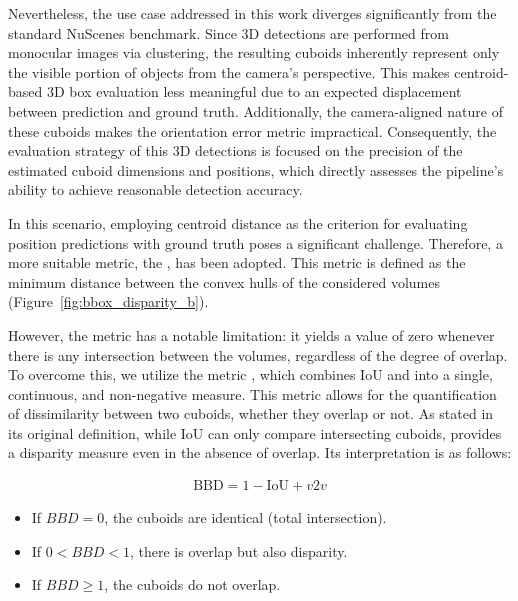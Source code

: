 Nevertheless, the use case addressed in this work diverges significantly from the standard NuScenes benchmark. Since 3D detections are performed from monocular images via clustering, the resulting cuboids inherently represent only the visible portion of objects from the camera's perspective. This makes centroid-based 3D box evaluation less meaningful due to an expected displacement between prediction and ground truth. Additionally, the camera-aligned nature of these cuboids makes the orientation error metric impractical. Consequently, the evaluation strategy of this 3D detections is focused on the precision of the estimated cuboid dimensions and positions, which directly assesses the pipeline's ability to achieve reasonable detection accuracy.

In this scenario, employing centroid distance as the criterion for evaluating position predictions with ground truth poses a significant challenge. Therefore, a more suitable metric, the , has been adopted. This metric is defined as the minimum distance between the convex hulls of the considered volumes (Figure~\ref{fig:bbox_disparity_b}).

However, the  metric has a notable limitation: it yields a value of zero whenever there is any intersection between the volumes, regardless of the degree of overlap. To overcome this, we utilize the  metric \cite{bounding_box_disparity}, which combines IoU and  into a single, continuous, and non-negative measure. This metric allows for the quantification of dissimilarity between two cuboids, whether they overlap or not. As stated in its original definition, while IoU can only compare intersecting cuboids,  provides a disparity measure even in the absence of overlap. Its interpretation is as follows:

\begin{equation}
    \begin{aligned}
    \text{BBD} = 1 - \text{IoU} + v2v
    \end{aligned}
    \label{eq:3d_metrics}
\end{equation}

\begin{itemize}
    \item If $BBD = 0$, the cuboids are identical (total intersection).
    \item If $0 < BBD < 1$, there is overlap but also disparity.
    \item If $BBD \geq 1$, the cuboids do not overlap.
\end{itemize}

